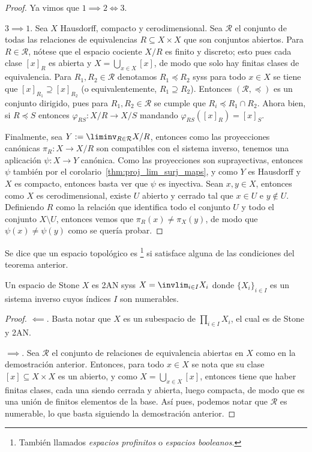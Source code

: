 \documentclass[topologia-analisis.tex]{subfiles}
\begin{document}
\begin{proof}
	Ya vimos que $1 \implies 2 \iff 3$.

	$3 \implies 1$. Sea $X$ Hausdorff, compacto y cerodimensional.
	Sea $\mathcal{R}$ el conjunto de todas las relaciones de equivalencias $R \subseteq X \times X$ que son conjuntos abiertos.
	Para $R \in \mathcal{R}$, nótese que el espacio cociente $X/R$ es finito y discreto; esto pues cada clase $[x]_R$ es abierta
	y $X = \bigcup_{x\in X} [x]$, de modo que solo hay finitas clases de equivalencia.
	Para $R_1, R_2 \in \mathcal{R}$ denotamos $R_1 \preceq R_2$ syss para todo $x \in X$ se tiene que $[x]_{R_1} \supseteq [x]_{R_2}$
	(o equivalentemente, $R_1 \supseteq R_2$).
	Entonces $(\mathcal{R}, \preceq)$ es un conjunto dirigido, pues para $R_1, R_2 \in \mathcal{R}$ se cumple que $R_i \preceq R_1 \cap R_2$.
	Ahora bien, si $R \preceq S$ entonces $\varphi_{RS} \colon X/R \to X/S$ mandando $\varphi_{RS}([x]_R) = [x]_S$.

	Finalmente, sea $Y := \liminv_{R \in \mathcal{R}} X/R$, entonces como las proyecciones canónicas $\pi_R \colon X \to X/R$ son compatibles
	con el sistema inverso, tenemos una aplicación $\psi \colon X \to Y$ canónica.
	Como las proyecciones son suprayectivas, entonces $\psi$ también por el corolario~\ref{thm:proj_lim_surj_maps}, y como $Y$ es Hausdorff y $X$
	es compacto, entonces basta ver que $\psi$ es inyectiva.
	Sean $x, y \in X$, entonces como $X$ es cerodimensional, existe $U$ abierto y cerrado tal que $x \in U$ e $y \notin U$.
	Definiendo $R$ como la relación que identifica todo el conjunto $U$ y todo el conjunto $X \setminus U$, entonces vemos que
	$\pi_R(x) \ne \pi_X(y)$, de modo que $\psi(x) \ne \psi(y)$ como se quería probar.
\end{proof}
\begin{mydef}
	Se dice que un espacio topológico es %
	\footnote{También llamados \textit{espacios profinitos} o \textit{espacios booleanos}.}
	si satisface alguna de las condiciones del teorema anterior.
\end{mydef}

\begin{cor}
	Un espacio de Stone $X$ es 2AN syss $X = \invlim_{i \in I} X_i$ donde $\{ X_i \}_{i\in I}$ es un sistema inverso cuyos índices $I$ son numerables.
\end{cor}
\begin{proof}
	$\impliedby$. Basta notar que $X$ es un subespacio de $\prod_{i\in I} X_i$, el cual es de Stone y 2AN.

	$\implies$. Sea $\mathcal{R}$ el conjunto de relaciones de equivalencia abiertas en $X$ como en la demostración anterior.
	Entonces, para todo $x \in X$ se nota que su clase $[x] \subseteq X \times X$ es un abierto, y como $X = \bigcup_{x\in X} [x]$,
	entonces tiene que haber finitas clases, cada una siendo cerrada y abierta, luego compacta, de modo que es una unión de finitos elementos de la base.
	Así pues, podemos notar que $\mathcal{R}$ es numerable, lo que basta siguiendo la demostración anterior.
\end{proof}
\thmdep{}
\end{document}
